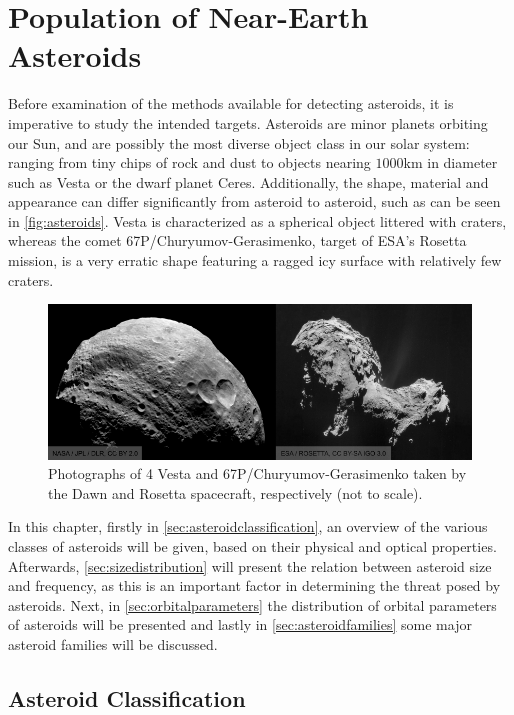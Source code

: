 \chapter{Population of Near-Earth Asteroids}
\label{ch:population}

Before examination of the methods available for detecting asteroids, it is imperative to study the intended targets. Asteroids are minor planets orbiting our Sun, and are possibly the most diverse object class in our solar system: ranging from tiny chips of rock and dust to objects nearing $1000$km in diameter such as Vesta or the dwarf planet Ceres. Additionally, the shape, material and appearance can differ significantly from asteroid to asteroid, such as can be seen in \autoref{fig:asteroids}. Vesta is characterized as a spherical object littered with craters, whereas the comet 67P/Churyumov-Gerasimenko, target of ESA's Rosetta mission, is a very erratic shape featuring a ragged icy surface with relatively few craters.\\

\begin{figure}[htbp]
    \centering
    \includegraphics[width=1.0\textwidth]{images/asteroids.png}
    \caption{Photographs of 4 Vesta and 67P/Churyumov-Gerasimenko taken by the Dawn and Rosetta spacecraft, respectively (not to scale).}
    \label{fig:asteroids}
\end{figure}

In this chapter, firstly in \autoref{sec:asteroidclassification}, an overview of the various classes of asteroids will be given, based on their physical and optical properties. Afterwards, \autoref{sec:sizedistribution} will present the relation between asteroid size and frequency, as this is an important factor in determining the threat posed by asteroids. Next, in \autoref{sec:orbitalparameters} the distribution of orbital parameters of asteroids will be presented and lastly in \autoref{sec:asteroidfamilies} some major asteroid families will be discussed.

\section{Asteroid Classification}
\label{sec:asteroidclassification}

